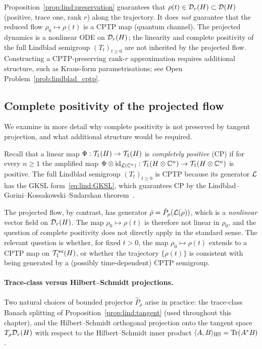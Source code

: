 \begin{remark}
\label{rem:lind:cptp}
Proposition~\ref{prop:lind:preservation} guarantees that $\rho(t)
\in \mathcal{D}_{r}(H) \subset \mathcal{D}(H)$ (positive, trace one, rank $r$)
along the trajectory. It does \emph{not} guarantee that the reduced
flow $\rho_0 \mapsto \rho(t)$ is a CPTP map (quantum channel).
The projected dynamics is a nonlinear ODE on $\mathcal{D}_{r}(H)$; the
linearity and complete positivity of the full Lindblad semigroup
$(T_t)_{t \geq 0}$ are not inherited by the projected flow.
Constructing a CPTP-preserving rank-$r$ approximation requires
additional structure, such as Kraus-form parametrisations;
see Open Problem~\ref{prob:lindblad_cptp}.
\end{remark}

\subsection*{Complete positivity of the projected flow}
\label{subsec:lind:cptp}

We examine in more detail why complete positivity is not preserved by
tangent projection, and what additional structure would be required.

Recall that a linear map $\Phi: \mathcal{T}_{1}(H) \to \mathcal{T}_{1}(H)$ is
\emph{completely positive} (CP) if for every $n \geq 1$ the amplified
map $\Phi \otimes \mathrm{id}_{\mathcal{L}(\mathbb{C}^n)}: \mathcal{T}_{1}(H \otimes \mathbb{C}^n) \to
\mathcal{T}_{1}(H \otimes \mathbb{C}^n)$ is positive. The full Lindblad semigroup
$(T_t)_{t \geq 0}$ is CPTP because its generator $\mathcal{L}$ has the
GKSL form~\eqref{eq:lind:GKSL}, which guarantees CP by the
Lindblad--Gorini--Kossakowski--Sudarshan theorem~\cite{BratteliRobinson1987}.

The projected flow, by contrast, has generator
$\dot\rho = \hat{P}_\rho(\mathcal{L}(\rho))$, which is a \emph{nonlinear}
vector field on $\mathcal{D}_{r}(H)$. The map
$\rho_0 \mapsto \rho(t)$ is therefore not linear in $\rho_0$, and
the question of complete positivity does not directly apply in the
standard sense. The relevant question is whether, for fixed $t > 0$,
the map $\rho_0 \mapsto \rho(t)$ extends to a CPTP map on $\mathcal{T}_{1}^{sa}(H)$,
or whether the trajectory $\{\rho(t)\}$ is consistent with being
generated by a (possibly time-dependent) CPTP semigroup.

\paragraph{Trace-class versus Hilbert--Schmidt projections.}
Two natural choices of bounded projector $\hat{P}_\rho$ arise
in practice: the trace-class Banach splitting of
Proposition~\ref{prop:lind:tangent} (used throughout this chapter),
and the Hilbert--Schmidt orthogonal projection onto the tangent space
$T_\rho \mathcal{D}_{r}(H)$ with respect to the Hilbert--Schmidt inner
product $\langle A, B \rangle_{\mathrm{HS}} = \mathrm{Tr}(A^*B)$.

